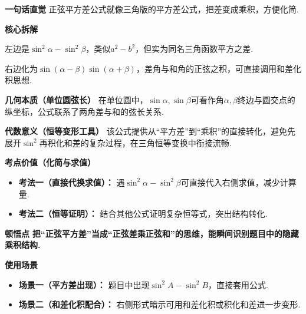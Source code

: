 \begin{explanationbox}
\textbf{\textcolor{CExplanation}{一句话直觉}}  
正弦平方差公式就像三角版的平方差公式，把差变成乘积，方便化简.

\medskip
\textbf{\textcolor{CExplanation}{核心拆解}}
\begin{description}[style=nextline, leftmargin=2.8em, labelsep=0.5em, itemsep=0.45em]
    \item[\textbf{要点一（平方差结构）：}] 左边是$\sin^2\alpha-\sin^2\beta$，类似$a^2-b^2$，但实为同名三角函数平方之差.
    \item[\textbf{要点二（积化和差形式）：}] 右边化为$\sin(\alpha-\beta)\sin(\alpha+\beta)$，差角与和角的正弦之积，可直接调用和差化积思想.
\end{description}

\medskip
\textbf{\textcolor{CExplanation}{几何本质（单位圆弦长）}}  
在单位圆中，$\sin\alpha,\sin\beta$可看作角$\alpha,\beta$终边与圆交点的纵坐标，公式联系了两角差与和的弦长关系.

\medskip
\textbf{\textcolor{CExplanation}{代数意义（恒等变形工具）}}  
该公式提供从“平方差”到“乘积”的直接转化，避免先展开$\sin^2$再积化和差的复杂过程，在三角恒等变换中衔接流畅.

\medskip
\textbf{\textcolor{CExplanation}{考点价值（化简与求值）}}
\begin{itemize}[leftmargin=*, itemsep=0.5em, topsep=0.4em]
    \item \textbf{考法一（直接代换求值）：} 遇$\sin^2\alpha-\sin^2\beta$可直接代入右侧求值，减少计算量.
    \item \textbf{考法二（恒等证明）：} 结合其他公式证明复杂恒等式，突出结构转化.
\end{itemize}

\medskip
\textbf{\textcolor{CExplanation}{顿悟点}}  
\textbf{把“正弦平方差”当成“正弦差乘正弦和”的思维，能瞬间识别题目中的隐藏乘积结构.}

\medskip
\textbf{\textcolor{CExplanation}{使用场景}}
\begin{itemize}[leftmargin=*, itemsep=0.5em, topsep=0.4em]
    \item \textbf{场景一（平方差出现）：} 题目中出现$\sin^2 A-\sin^2 B$，直接套用公式.
    \item \textbf{场景二（和差化积配合）：} 右侧形式暗示可用和差化积或积化和差进一步变形.
\end{itemize}
\end{explanationbox}
